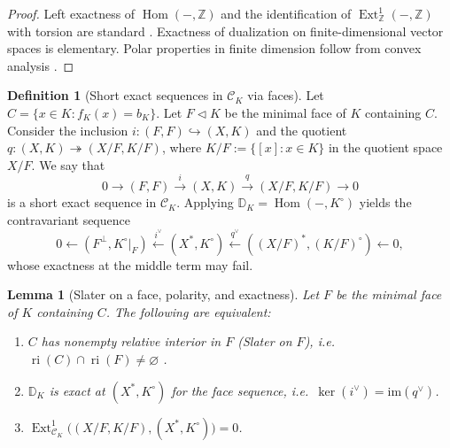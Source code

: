 \documentclass[12pt]{article}
\newcommand{\Hom}{\operatorname{Hom}}
\newcommand{\Ext}{\operatorname{Ext}}
\theoremstyle{plain}
\newtheorem{lemma}[theorem]{Lemma}
\theoremstyle{definition}
\newtheorem{definition}[theorem]{Definition}
\theoremstyle{remark}
\numberwithin{equation}{section}
\begin{document}
\begin{proof}
Left exactness of $\Hom(-,\mathbb Z)$ and the identification of $\Ext^1_{\mathbb Z}(-,\mathbb Z)$ with torsion are standard \cite{Weibel1994}. Exactness of dualization on finite-dimensional vector spaces is elementary. Polar properties in finite dimension follow from convex analysis \cite{Rockafellar1970}.
\end{proof}

\begin{definition}[Short exact sequences in $\mathcal C_K$ via faces]
Let $C=\{x\in K: f_K(x)=b_K\}$. Let $F\triangleleft K$ be the minimal face of $K$ containing $C$. Consider the inclusion $i:(F,F)\hookrightarrow (X,K)$ and the quotient $q:(X,K)\twoheadrightarrow (X/F,K/F)$, where $K/F:=\{[x]: x\in K\}$ in the quotient space $X/F$. We say that
\[
0\to (F,F)\xrightarrow{i} (X,K)\xrightarrow{q} (X/F,K/F)\to 0
\]
is a short exact sequence in $\mathcal C_K$. Applying $\mathbb D_K=\Hom(-,K^\circ)$ yields the contravariant sequence
\[
0\leftarrow (F^\perp,K^\circ|_{F}) \xleftarrow{i^\vee} (X^*,K^\circ) \xleftarrow{q^\vee} ((X/F)^*,(K/F)^\circ)\leftarrow 0,
\]
whose exactness at the middle term may fail.
\end{definition}

\begin{lemma}[Slater on a face, polarity, and exactness]\label{lem:slater-face-exact}
Let $F$ be the minimal face of $K$ containing $C$. The following are equivalent:
\begin{enumerate}[label=(\alph*)]
\item $C$ has nonempty relative interior in $F$ (Slater on $F$), i.e.\ $\operatorname{ri}(C)\cap \operatorname{ri}(F)\neq \varnothing$ \cite{Rockafellar1970}.
\item $\mathbb D_K$ is exact at $(X^*,K^\circ)$ for the face sequence, i.e.\ $\ker(i^\vee)=\mathrm{im}(q^\vee)$.
\item $\Ext^1_{\mathcal C_K}\big((X/F,K/F), (X^*,K^\circ)\big)=0$.
\end{enumerate}
\end{lemma}
\end{document}

